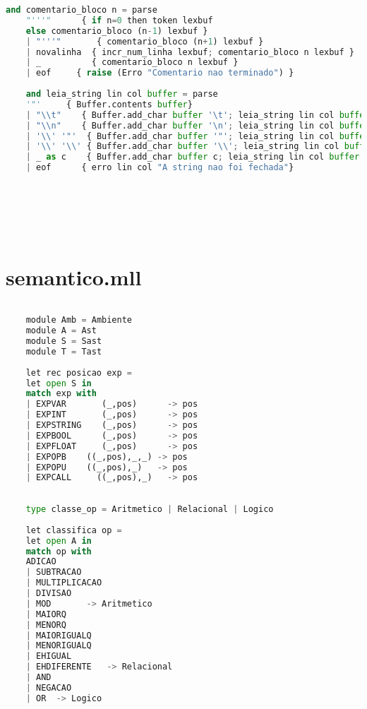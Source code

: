 \documentclass[hidelinks,12pt]{article}
\begin{document}
\begin{appendices}
\begin{lstlisting}[caption=lexico.mll, language=python]
	and comentario_bloco n = parse
	"'''"      { if n=0 then token lexbuf 
	else comentario_bloco (n-1) lexbuf }
	| "'''"       { comentario_bloco (n+1) lexbuf }
	| novalinha  { incr_num_linha lexbuf; comentario_bloco n lexbuf }
	| _          { comentario_bloco n lexbuf }
	| eof     { raise (Erro "Comentario nao terminado") }
	
	and leia_string lin col buffer = parse
	'"'     { Buffer.contents buffer}
	| "\\t"    { Buffer.add_char buffer '\t'; leia_string lin col buffer lexbuf }
	| "\\n"    { Buffer.add_char buffer '\n'; leia_string lin col buffer lexbuf }
	| '\\' '"'  { Buffer.add_char buffer '"'; leia_string lin col buffer lexbuf }
	| '\\' '\\' { Buffer.add_char buffer '\\'; leia_string lin col buffer lexbuf }
	| _ as c    { Buffer.add_char buffer c; leia_string lin col buffer lexbuf }
	| eof      { erro lin col "A string nao foi fechada"}
	
	
	
	
	
	
	\end{lstlisting}
	
	\newpage
	\chapter{semantico.mll}
	
	\begin{lstlisting}[caption=semantico.mll, language=python]
	
	module Amb = Ambiente
	module A = Ast
	module S = Sast
	module T = Tast
	
	let rec posicao exp = 
	let open S in
	match exp with 
	| EXPVAR       (_,pos)      -> pos
	| EXPINT       (_,pos)      -> pos
	| EXPSTRING    (_,pos)      -> pos
	| EXPBOOL      (_,pos)      -> pos
	| EXPFLOAT     (_,pos)      -> pos
	| EXPOPB    ((_,pos),_,_) -> pos
	| EXPOPU    ((_,pos),_)   -> pos
	| EXPCALL     ((_,pos),_)   -> pos
	
	
	type classe_op = Aritmetico | Relacional | Logico
	
	let classifica op =
	let open A in
	match op with
	ADICAO
	| SUBTRACAO
	| MULTIPLICACAO
	| DIVISAO
	| MOD       -> Aritmetico
	| MAIORQ
	| MENORQ
	| MAIORIGUALQ
	| MENORIGUALQ
	| EHIGUAL
	| EHDIFERENTE   -> Relacional
	| AND
	| NEGACAO
	| OR  -> Logico
	

\end{lstlisting}
\end{appendices}
\end{document}
